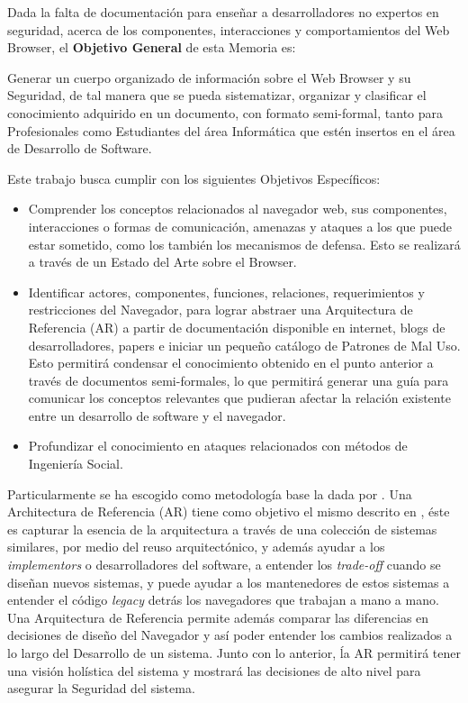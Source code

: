 Dada la falta de documentación para enseñar a desarrolladores no expertos en seguridad, acerca de los componentes, interacciones y comportamientos del Web Browser, el \textbf{Objetivo General} de esta Memoria es: 
\begin{center}
	Generar un cuerpo organizado de información sobre el Web Browser y su Seguridad, de tal manera que se pueda sistematizar, organizar y clasificar el conocimiento adquirido en un documento, con formato semi-formal, tanto para Profesionales como Estudiantes del área Informática que estén insertos en el área de Desarrollo de Software.
\end{center} 

Este trabajo busca cumplir con los siguientes Objetivos Específicos:

\begin{itemize}
	\item Comprender los conceptos relacionados al navegador web, sus componentes, interacciones o formas de comunicación, amenazas y ataques a los que puede estar sometido, como los también los mecanismos de defensa. Esto se realizará a través de un Estado del Arte sobre el Browser.
	\item Identificar actores, componentes, funciones, relaciones, requerimientos y restricciones del Navegador, para lograr abstraer una Arquitectura de Referencia (AR) a partir de documentación disponible en internet, blogs de desarrolladores, papers e iniciar un pequeño catálogo de Patrones de Mal Uso. Esto permitirá condensar el conocimiento obtenido en el punto anterior a través de documentos semi-formales, lo que permitirá generar una guía para comunicar los conceptos relevantes que pudieran afectar la relación existente entre un desarrollo de software y el navegador.
	\item Profundizar el conocimiento en ataques relacionados con métodos de Ingeniería Social.
	
\end{itemize} 

Particularmente se ha escogido como metodología base la dada por \cite{braz2008eliciting,fernandez2013security}. Una Architectura de Referencia (AR) tiene como objetivo el mismo descrito en \cite{2005-grosskurth-browser-refarch, preprint-grosskurth-browser-archevol, Avgeriou2003, Galster2011a}, éste es capturar la esencia de la arquitectura a través de una colección de sistemas similares, por medio del reuso arquitectónico, y además ayudar a los \textit{implementors} o desarrolladores del software, a entender los \textit{trade-off} cuando se diseñan nuevos sistemas, y puede ayudar a los mantenedores de estos sistemas a entender el código \textit{legacy} detrás los navegadores que trabajan a mano a mano. Una Arquitectura de Referencia permite además comparar las diferencias en decisiones de diseño del Navegador y así poder entender los cambios realizados a lo largo del Desarrollo de un sistema. Junto con lo anterior, ĺa AR permitirá tener una visión holística del sistema y mostrará las decisiones de alto nivel para asegurar la Seguridad del sistema. 

